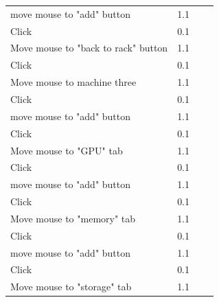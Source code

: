 \documentclass[11pt]{article}
\begin{document}
\begin{table}[]
{\begin{tabular}{llll}
					move mouse to "add" button               & 1.1       &                                                 &     \\
					Click                                    & 0.1       &                                                 &     \\
					Move mouse to "back to rack" button      & 1.1       &                                                 &     \\
					Click                                    & 0.1       &                                                 &     \\
					Move mouse to machine three              & 1.1       &                                                 &     \\
					Click                                    & 0.1       &                                                 &     \\
					move mouse to "add" button               & 1.1       &                                                 &     \\
					Click                                    & 0.1       &                                                 &     \\
					Move mouse to "GPU" tab                  & 1.1       &                                                 &     \\
					Click                                    & 0.1       &                                                 &     \\
					move mouse to "add" button               & 1.1       &                                                 &     \\
					Click                                    & 0.1       &                                                 &     \\
					Move mouse to "memory" tab               & 1.1       &                                                 &     \\
					Click                                    & 0.1       &                                                 &     \\
					move mouse to "add" button               & 1.1       &                                                 &     \\
					Click                                    & 0.1       &                                                 &     \\
					Move mouse to "storage" tab              & 1.1       &                                                 &     \\

\end{tabular}}
\end{table}
\end{document}
